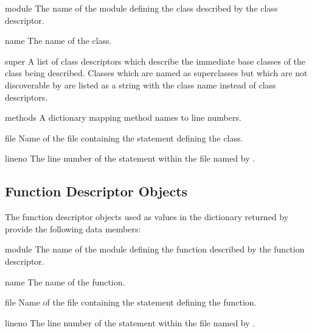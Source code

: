 \begin{memberdesc}{module}
  The name of the module defining the class described by the class
  descriptor.
\end{memberdesc}

\begin{memberdesc}{name}
  The name of the class.
\end{memberdesc}

\begin{memberdesc}{super}
  A list of class descriptors which describe the immediate base
  classes of the class being described.  Classes which are named as
  superclasses but which are not discoverable by
   are listed as a string with the class name
  instead of class descriptors.
\end{memberdesc}

\begin{memberdesc}{methods}
  A dictionary mapping method names to line numbers.
\end{memberdesc}

\begin{memberdesc}{file}
  Name of the file containing the  statement defining the class.
\end{memberdesc}

\begin{memberdesc}{lineno}
  The line number of the  statement within the file named by
  .
\end{memberdesc}

\subsection{Function Descriptor Objects \label{pyclbr-function-objects}}

The function descriptor objects used as values in the dictionary returned
by  provide the following data members:


\begin{memberdesc}{module}
  The name of the module defining the function described by the function
  descriptor.
\end{memberdesc}

\begin{memberdesc}{name}
  The name of the function.
\end{memberdesc}

\begin{memberdesc}{file}
  Name of the file containing the  statement defining the function.
\end{memberdesc}

\begin{memberdesc}{lineno}
  The line number of the  statement within the file named by
  .
\end{memberdesc}

